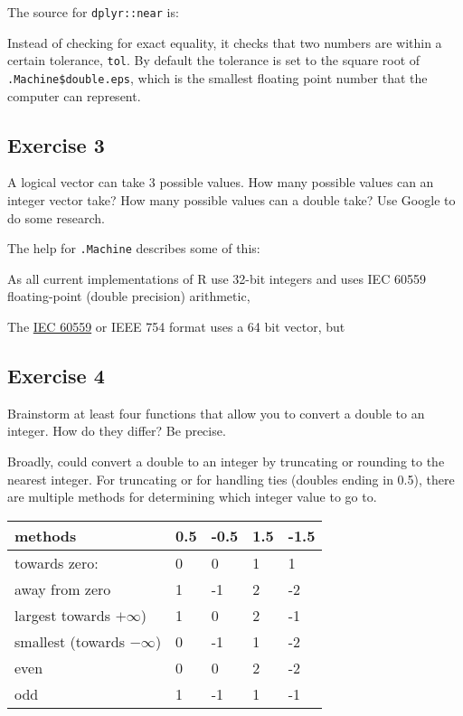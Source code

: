 \documentclass[]{book}
\newenvironment{Shaded}{\begin{snugshade}}{\end{snugshade}}
\newcommand{\CommentTok}[1]{\textcolor[rgb]{0.56,0.35,0.01}{\textit{#1}}}
\newcommand{\NormalTok}[1]{#1}
\newcommand{\OperatorTok}[1]{\textcolor[rgb]{0.81,0.36,0.00}{\textbf{#1}}}
\theoremstyle{plain}
\theoremstyle{remark}
\theoremstyle{definition}
\theoremstyle{definition}
\theoremstyle{definition}
\theoremstyle{remark}
\begin{document}
The source for \texttt{dplyr::near} is:

\begin{Shaded}
\end{Shaded}

Instead of checking for exact equality, it checks that two numbers are
within a certain tolerance, \texttt{tol}. By default the tolerance is
set to the square root of \texttt{.Machine\$double.eps}, which is the
smallest floating point number that the computer can represent.

\hypertarget{exercise-3-41}{%
\subsection{Exercise 3}\label{exercise-3-41}}

A logical vector can take 3 possible values. How many possible values
can an integer vector take? How many possible values can a double take?
Use Google to do some research.

The help for \texttt{.Machine} describes some of this:

As all current implementations of R use 32-bit integers and uses IEC
60559 floating-point (double precision) arithmetic,

The
\href{https://en.wikipedia.org/wiki/Double-precision_floating-point_format}{IEC
60559} or IEEE 754 format uses a 64 bit vector, but

\hypertarget{exercise-4-30}{%
\subsection{Exercise 4}\label{exercise-4-30}}

Brainstorm at least four functions that allow you to convert a double to
an integer. How do they differ? Be precise.

Broadly, could convert a double to an integer by truncating or rounding
to the nearest integer. For truncating or for handling ties (doubles
ending in 0.5), there are multiple methods for determining which integer
value to go to.

\begin{longtable}[]{@{}lllll@{}}
\toprule
methods & 0.5 & -0.5 & 1.5 & -1.5\tabularnewline
\midrule
\endhead
towards zero: & 0 & 0 & 1 & 1\tabularnewline
away from zero & 1 & -1 & 2 & -2\tabularnewline
largest towards \(+\infty\)) & 1 & 0 & 2 & -1\tabularnewline
smallest (towards \(-\infty\)) & 0 & -1 & 1 & -2\tabularnewline
even & 0 & 0 & 2 & -2\tabularnewline
odd & 1 & -1 & 1 & -1\tabularnewline
\bottomrule
\end{longtable}
\end{document}
